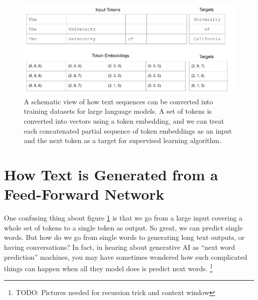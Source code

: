 \begin{figure}[h]
\centering
\includegraphics[scale=.45]{./images/nextWordPrediction.png}
\caption[Jeff Yoshimi]{A schematic view of how text sequences can be converted into training datasets for large language models. A set of tokens is converted into vectors using a token embedding, and we can treat each concatenated partial sequence of token embeddings as an input and the next token as a target for supervised learning algorithm. }
\label{nextWordPrediction}
\end{figure}
  
\section{How Text is Generated from a Feed-Forward Network}

One confusing thing about figure \ref{nextWordPrediction} is that we go from a large input covering a whole set of tokens to a single token as output. So great, we can predict single words. But how do we go from single words to generating long text outputs, or having conversations? In fact, in hearing about generative AI as ``next word prediction'' machines, you may have sometimes wondered how such complicated things can happen when all they model does is predict next words. \footnote{TODO: Pictures needed for recursion trick and context window}

